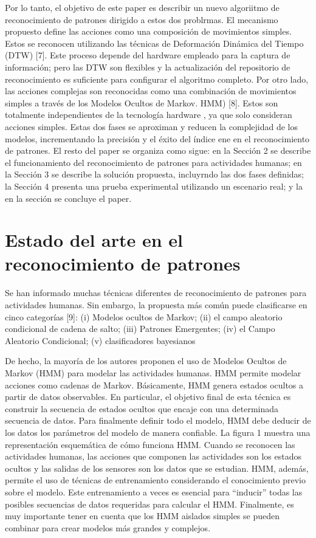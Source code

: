 \documentclass{article}
\begin{document}
Por lo tanto, el objetivo de este paper es describir un nuevo algoriitmo de reconocimiento de patrones dirigido a estos dos problrmas. El mecanismo propuesto define las acciones como una composición de movimientos simples. Estos se reconocen utilizando las técnicas de Deformación Dinámica del Tiempo (DTW) [7]. Este proceso depende del hardware empleado para la captura de información; pero las DTW son flexibles y la actualización del repositorio de reconocimiento es suficiente para configurar el algoritmo completo. Por otro lado, las acciones complejas son reconocidas como una combinación de movimientos simples a través de los Modelos Ocultos de Markov. HMM) [8]. Estos son totalmente independientes de la tecnología hardware , ya que solo consideran acciones simples. Estas dos fases  se aproximan y reducen la complejidad de los modelos, incrementando la precisión y el éxito del índice ene en el reconocimiento de patrones.
El resto del paper se organiza como sigue: en la Sección 2 se describe el funcionamiento del reconocimiento de patrones para actividades humanas; en la Sección 3 se describe la solución propuesta, incluyrndo las dos fases definidas; la Sección 4 presenta una prueba  experimental utilizando un escenario real; y la en la sección se concluye el paper.
\section {Estado del arte en el reconocimiento de patrones }
Se han informado muchas técnicas diferentes de reconocimiento de patrones para actividades humanas. Sin embargo, la propuesta más común puede clasificarse en cinco
categorías [9]: 
	(i) Modelos ocultos de Markov; 
	(ii) el campo aleatorio condicional de cadena de salto; 
	(iii) Patrones Emergentes; 
	(iv) el Campo Aleatorio Condicional; 
	(v) clasificadores bayesianos

De hecho, la mayoría de los autores proponen el uso de Modelos Ocultos de Markov (HMM) para modelar las actividades humanas. HMM permite modelar acciones como cadenas de Markov. Básicamente, HMM genera estados ocultos a partir de datos observables. En particular, el objetivo final de esta técnica es construir la secuencia de estados ocultos que encaje con una determinada secuencia de datos. Para finalmente definir todo el modelo, HMM debe deducir de los datos los parámetros del modelo de manera confiable. La figura 1 muestra una representación esquemática de cómo funciona HMM. Cuando se reconocen las actividades humanas, las acciones que componen las actividades son los estados ocultos y las salidas de los sensores son los datos que se estudian. HMM, además, permite el uso de técnicas de entrenamiento considerando el conocimiento previo sobre el modelo. Este entrenamiento a veces es esencial para “inducir” todas las posibles secuencias de datos requeridas para calcular el HMM. Finalmente, es muy importante tener en cuenta que los HMM aislados simples se pueden combinar para crear modelos más grandes y complejos.
\end{document}
